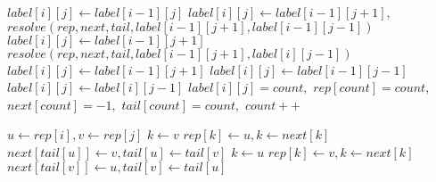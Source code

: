 \begin{algorithm*}

\begin{algorithmic}
					\State $label[i][j] \gets label[i-1][j]$
				\Else
							\State $label[i][j] \gets label[i-1][j+1],$
							\State $resolve(rep,next,tail,label[i-1][j+1],label[i-1][j-1])$
						\Else
								\State $label[i][j] \gets label[i-1][j+1]$
								\State $resolve(rep,next,tail,label[i-1][j+1],label[i][j-1])$
							\Else
								\State $label[i][j] \gets label[i-1][j+1]$
							\EndIf
						\EndIf
					\Else
							\State $label[i][j] \gets label[i-1][j-1]$
						\Else
								\State $label[i][j] \gets label[i][j-1]$
							\Else
								\State $label[i][j] = count,$
								\State $rep[count] = count,$
								\State $next[count] = -1,$
								\State $tail[count] = count,$
								\State $count++$
							\EndIf
						\EndIf
					\EndIf
				\EndIf
			\EndIf
		\EndFor
	\EndFor
	\EndFunction
\end{algorithmic}	
\end{algorithm*}


 \begin{algorithm*}
 \begin{algorithmic}
 	\State $u \gets rep[i], v \gets rep[j]$
 		\State $k \gets v$
 			\State $rep[k] \gets u, k \gets next[k]$
 		\EndWhile
 		\State $next[tail[u]] \gets v, tail[u] \gets tail[v]$
 		\State $k \gets u$
 			\State $rep[k] \gets v, k \gets next[k]$
 		\EndWhile
 		\State $next[tail[v]] \gets u, tail[v] \gets tail[u]$
 	\EndIf
 \EndFunction
 \end{algorithmic}
 \end{algorithm*}
